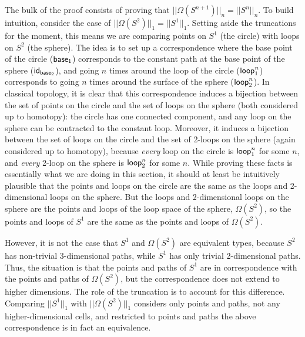 The bulk of the proof consists of proving that $||\Omega(S^{n+1})||_n =
||S^{n}||_n$.  To build intuition, consider the case of
$||\Omega(S^2)||_1 = ||S^1||_1$.  Setting aside the truncations for the
moment, this means we are comparing points on $S^1$ (the circle) with
loops on $S^2$ (the sphere).  The idea is to set up a correspondence
where the base point of the circle ($\mathsf{base_1}$) corresponds to the
constant path at the base point of the sphere ($\mathsf{id}_{\mathsf{base}_2}$), and
going $n$ times around the loop of the circle ($\mathsf{loop}_1^n$)
corresponds to going $n$ times around the surface of the sphere
($\mathsf{loop}_2^n$).  In classical topology, it is clear that this
correspondence induces a bijection between the set of points on the
circle and the set of loops on the sphere (both considered up to
homotopy): the circle has one connected component, and any loop on the
sphere can be contracted to the constant loop.  Moreover, it induces a
bijection between the set of loops on the circle and the set of 2-loops
on the sphere (again considered up to homotopy), because \emph{every}
loop on the circle is $\mathsf{loop}_1^n$ for some $n$, and \emph{every}
2-loop on the sphere is $\mathsf{loop}_2^n$ for some $n$. While proving
these facts is essentially what we are doing in this section, it should
at least be intuitively plausible that the points and loops on the
circle are the same as the loops and 2-dimensional loops on the sphere.
But the loops and 2-dimensional loops on the sphere are the points and
loops of the loop space of the sphere, $\Omega(S^2)$, so the points and
loops of $S^1$ are the same as the points and loops of $\Omega(S^2)$.

However, it is not the case that $S^1$ and $\Omega(S^2)$ are equivalent
types, because $S^2$ has non-trivial 3-dimensional paths, while $S^1$
has only trivial 2-dimensional paths.  Thus, the situation is that the
points and paths of $S^1$ are in correspondence with the points and
paths of $\Omega(S^2)$, but the correspondence does not extend to higher
dimensions.  The role of the truncation is to account for this
difference.  Comparing $||S^1||_1$ with $||\Omega(S^2)||_1$ considers
only points and paths, not any higher-dimensional cells, and restricted
to points and paths the above correspondence is in fact an equivalence.

